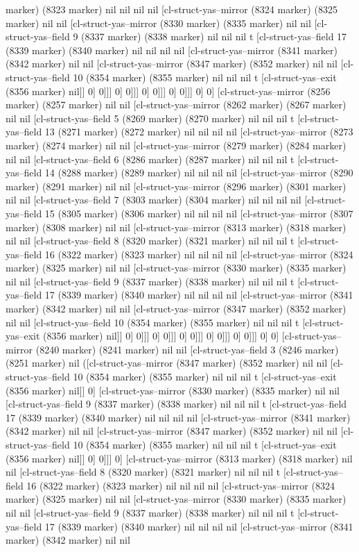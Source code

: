 {{marker) (8323 marker) nil nil nil nil [cl-struct-yas--mirror (8324 marker) (8325 marker) nil nil [cl-struct-yas--mirror (8330 marker) (8335 marker) nil nil [cl-struct-yas--field 9 (8337 marker) (8338 marker) nil nil nil t [cl-struct-yas--field 17 (8339 marker) (8340 marker) nil nil nil nil [cl-struct-yas--mirror (8341 marker) (8342 marker) nil nil [cl-struct-yas--mirror (8347 marker) (8352 marker) nil nil [cl-struct-yas--field 10 (8354 marker) (8355 marker) nil nil nil t [cl-struct-yas--exit (8356 marker) nil]] 0] 0]]] 0] 0]]] 0] 0]]] 0] 0]]] 0] 0] [cl-struct-yas--mirror (8256 marker) (8257 marker) nil nil [cl-struct-yas--mirror (8262 marker) (8267 marker) nil nil [cl-struct-yas--field 5 (8269 marker) (8270 marker) nil nil nil t [cl-struct-yas--field 13 (8271 marker) (8272 marker) nil nil nil nil [cl-struct-yas--mirror (8273 marker) (8274 marker) nil nil [cl-struct-yas--mirror (8279 marker) (8284 marker) nil nil [cl-struct-yas--field 6 (8286 marker) (8287 marker) nil nil nil t [cl-struct-yas--field 14 (8288 marker) (8289 marker) nil nil nil nil [cl-struct-yas--mirror (8290 marker) (8291 marker) nil nil [cl-struct-yas--mirror (8296 marker) (8301 marker) nil nil [cl-struct-yas--field 7 (8303 marker) (8304 marker) nil nil nil nil [cl-struct-yas--field 15 (8305 marker) (8306 marker) nil nil nil nil [cl-struct-yas--mirror (8307 marker) (8308 marker) nil nil [cl-struct-yas--mirror (8313 marker) (8318 marker) nil nil [cl-struct-yas--field 8 (8320 marker) (8321 marker) nil nil nil t [cl-struct-yas--field 16 (8322 marker) (8323 marker) nil nil nil nil [cl-struct-yas--mirror (8324 marker) (8325 marker) nil nil [cl-struct-yas--mirror (8330 marker) (8335 marker) nil nil [cl-struct-yas--field 9 (8337 marker) (8338 marker) nil nil nil t [cl-struct-yas--field 17 (8339 marker) (8340 marker) nil nil nil nil [cl-struct-yas--mirror (8341 marker) (8342 marker) nil nil [cl-struct-yas--mirror (8347 marker) (8352 marker) nil nil [cl-struct-yas--field 10 (8354 marker) (8355 marker) nil nil nil t [cl-struct-yas--exit (8356 marker) nil]] 0] 0]]] 0] 0]]] 0] 0]]] 0] 0]]] 0] 0]]] 0] 0] [cl-struct-yas--mirror (8240 marker) (8241 marker) nil nil [cl-struct-yas--field 3 (8246 marker) (8251 marker) nil ([cl-struct-yas--mirror (8347 marker) (8352 marker) nil nil [cl-struct-yas--field 10 (8354 marker) (8355 marker) nil nil nil t [cl-struct-yas--exit (8356 marker) nil]] 0] [cl-struct-yas--mirror (8330 marker) (8335 marker) nil nil [cl-struct-yas--field 9 (8337 marker) (8338 marker) nil nil nil t [cl-struct-yas--field 17 (8339 marker) (8340 marker) nil nil nil nil [cl-struct-yas--mirror (8341 marker) (8342 marker) nil nil [cl-struct-yas--mirror (8347 marker) (8352 marker) nil nil [cl-struct-yas--field 10 (8354 marker) (8355 marker) nil nil nil t [cl-struct-yas--exit (8356 marker) nil]] 0] 0]]] 0] [cl-struct-yas--mirror (8313 marker) (8318 marker) nil nil [cl-struct-yas--field 8 (8320 marker) (8321 marker) nil nil nil t [cl-struct-yas--field 16 (8322 marker) (8323 marker) nil nil nil nil [cl-struct-yas--mirror (8324 marker) (8325 marker) nil nil [cl-struct-yas--mirror (8330 marker) (8335 marker) nil nil [cl-struct-yas--field 9 (8337 marker) (8338 marker) nil nil nil t [cl-struct-yas--field 17 (8339 marker) (8340 marker) nil nil nil nil [cl-struct-yas--mirror (8341 marker) (8342 marker) nil nil }}
